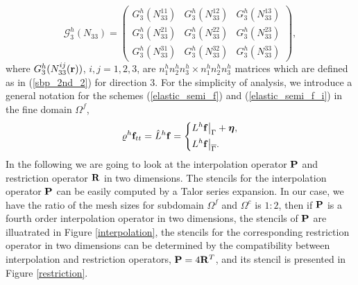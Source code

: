 \[ \mathcal{G}^{h}_3({N}_{33}) = \left(\begin{array}{ccc}
G_3^{h}(N_{33}^{11}) & G_3^{h}(N_{33}^{12})  & G_3^{h}(N_{33}^{13}) \\
G_3^{h}(N_{33}^{21}) & G_3^{h}(N_{33}^{22})  & G_3^{h}(N_{33}^{23}) \\
G_3^{h}(N_{33}^{31}) & G_3^{h}(N_{33}^{32})  & G_3^{h}(N_{33}^{33}) \end{array}\right),\]
where ${G}_3^{h}(N_{33}^{ij}({\bf r}))$, $i,j = 1,2,3$, are $n_1^{h}n_2^{h}n_3^{h}\times n_1^{h}n_2^{h}n_3^{h}$ matrices which are defined as in (\ref{sbp_2nd_2}) for direction $3$. For the simplicity of analysis, we introduce a general notation for the schemes (\ref{elastic_semi_f}) and (\ref{elastic_semi_f_i}) in the fine domain $\Omega^f$,
\begin{align}\label{fine_scheme}
{\varrho}^h{\bf f}_{tt} = \hat{L}^h{\bf f} = \left\{
\begin{aligned}
&L^h{\bf f}\big|_\Gamma +{\bm \eta}, \\
&L^h{\bf f}\big|_{\overline{\Gamma}}.
\end{aligned}
\right.
\end{align}
In the following we are going to look at the interpolation operator ${\bf P}$ and restriction operator ${\bf R}$ in two dimensions. The stencils for the interpolation operator ${\bf P}$ can be easily computed by a Talor series expansion. In our case, we have the ratio of the mesh sizes for subdomain $\Omega^f$ and $\Omega^c$ is $1:2$, then if  ${\bf P}$ is a fourth order interpolation operator in two dimensions,  the stencils of ${\bf P}$ are illuatrated in  Figure \ref{interpolation}, the stencils for the corresponding restriction operator in two dimensions can be determined by the compatibility between interpolation and restriction operators, ${\bf P} = 4{\bf R}^T$, and its stencil is presented in Figure \ref{restriction}.
